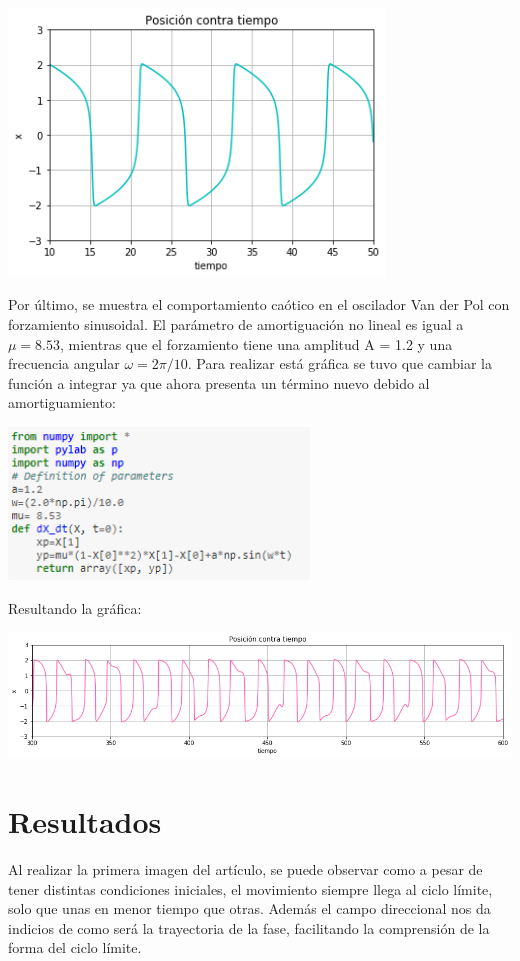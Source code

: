 \documentclass{article}
\begin{document}
\begin{center}
  \includegraphics[width=0.75\textwidth]{Posicion_contra_tiempo.png}
\end{center}
Por último, se muestra el comportamiento caótico en el oscilador Van der Pol con forzamiento sinusoidal. El parámetro de amortiguación no lineal es igual a $\mu=8.53$, mientras que el forzamiento tiene una amplitud A = 1.2 y una frecuencia angular $\omega = 2\pi / 10$. Para realizar está gráfica se tuvo que cambiar la función a integrar ya que ahora presenta un término nuevo debido al amortiguamiento:
\begin{center}
  \includegraphics[width=0.6\textwidth]{Funcion2.PNG}
\end{center}
Resultando la gráfica:
\begin{center}
  \includegraphics[width=1.2\textwidth]{Posicion_contra_tiempo2.png}
\end{center}
\section{Resultados}
Al realizar la primera imagen del artículo, se puede observar como a pesar de tener distintas condiciones iniciales, el movimiento siempre llega al ciclo límite, solo que unas en menor tiempo que otras. Además el campo direccional nos da indicios de como será la trayectoria de la fase, facilitando la comprensión de la forma del ciclo límite.
\end{document}
